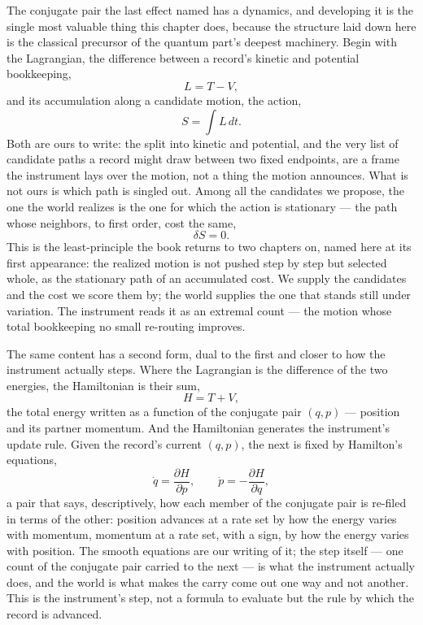 The conjugate pair the last effect named has a dynamics, and developing it is the single most valuable thing
this chapter does, because the structure laid down here is the classical precursor of the quantum part's
deepest machinery. Begin with the Lagrangian, the difference between a record's kinetic and potential
bookkeeping,
\begin{equation}
  L = T - V,
\end{equation}
and its accumulation along a candidate motion, the action,
\begin{equation}
  S = \int L\, dt .
\end{equation}
Both are ours to write: the split into kinetic and potential, and the very list of candidate paths a record
might draw between two fixed endpoints, are a frame the instrument lays over the motion, not a thing the motion
announces. What is not ours is which path is singled out. Among all the candidates we propose, the one the
world realizes is the one for which the action is stationary --- the path whose neighbors, to first order, cost
the same,
\begin{equation}
  \delta S = 0 .
\end{equation}
This is the least-principle the book returns to two chapters on, named here at its first appearance: the
realized motion is not pushed step by step but selected whole, as the stationary path of an accumulated cost.
We supply the candidates and the cost we score them by; the world supplies the one that stands still under
variation. The instrument reads it as an extremal count --- the motion whose total bookkeeping no small
re-routing improves.

The same content has a second form, dual to the first and closer to how the instrument actually steps. Where
the Lagrangian is the difference of the two energies, the Hamiltonian is their sum,
\begin{equation}
  H = T + V,
\end{equation}
the total energy written as a function of the conjugate pair $(q, p)$ --- position and its partner momentum.
And the Hamiltonian generates the instrument's update rule. Given the record's current $(q, p)$, the next is
fixed by Hamilton's equations,
\begin{equation}
  \dot q = \frac{\partial H}{\partial p}, \qquad \dot p = -\frac{\partial H}{\partial q},
\end{equation}
a pair that says, descriptively, how each member of the conjugate pair is re-filed in terms of the other:
position advances at a rate set by how the energy varies with momentum, momentum at a rate set, with a sign,
by how the energy varies with position. The smooth equations are our writing of it; the step itself --- one
count of the conjugate pair carried to the next --- is what the instrument actually does, and the world is what
makes the carry come out one way and not another. This is the instrument's step, not a formula to evaluate but
the rule by which the record is advanced.

